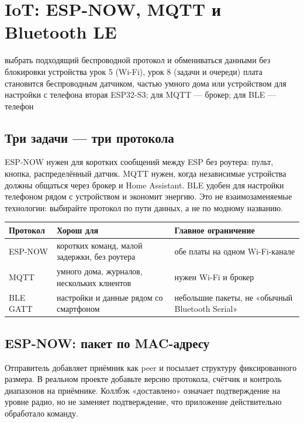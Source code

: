 \section{IoT: ESP-NOW, MQTT и Bluetooth LE}
\lessonintro
  {выбрать подходящий беспроводной протокол и обмениваться данными без блокировки устройства}
  {урок 5 (Wi-Fi), урок 8 (задачи и очереди)}
  {плата становится беспроводным датчиком, частью умного дома или устройством для настройки с телефона}
  {вторая ESP32-S3; для MQTT --- брокер; для BLE --- телефон}

\subsection{Три задачи --- три протокола}

ESP-NOW нужен для коротких сообщений между ESP без роутера: пульт, кнопка, распределённый датчик.
MQTT нужен, когда независимые устройства должны общаться через брокер и Home Assistant. BLE удобен для
настройки телефоном рядом с устройством и экономит энергию. Это не взаимозаменяемые технологии:
выбирайте протокол по пути данных, а не по модному названию.

\begin{center}\small
\begin{tabularx}{\textwidth}{@{}l X X@{}}
\toprule
Протокол & Хорош для & Главное ограничение \\
\midrule
ESP-NOW & коротких команд, малой задержки, без роутера & обе платы на одном Wi-Fi-канале \\
MQTT & умного дома, журналов, нескольких клиентов & нужен Wi-Fi и брокер \\
BLE GATT & настройки и данные рядом со смартфоном & небольшие пакеты, не «обычный Bluetooth Serial» \\
\bottomrule
\end{tabularx}
\end{center}

\subsection{ESP-NOW: пакет по MAC-адресу}

Отправитель добавляет приёмник как peer и посылает структуру фиксированного размера. В реальном
проекте добавьте версию протокола, счётчик  и контроль диапазонов на приёмнике.
Коллбэк «доставлено» означает подтверждение на уровне радио, но не заменяет подтверждение, что
приложение действительно обработало команду.

